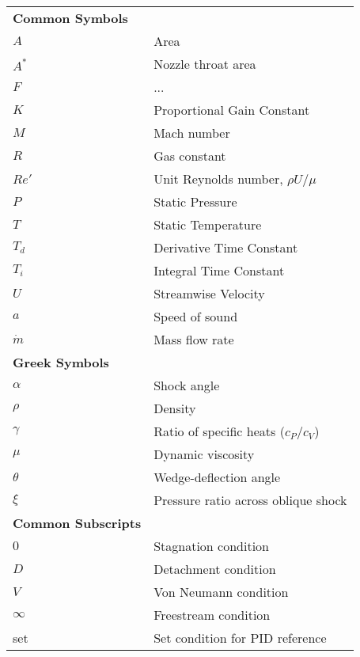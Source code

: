 \begin{spacing}{1.0}
\begin{longtable}[htbp]{@{}p{} p{}@{}}
        \textbf{Common Symbols}\\ [2ex] 
        $A$ & Area \\ [2ex]
        $A^*$ & Nozzle throat area \\ [2ex]
        $F$ & ...\\ [2ex]
        $K$ & Proportional Gain Constant \\ [2ex]
        $M$ & Mach number\\ [2ex]
        $R$ & Gas constant\\ [2ex]
        $Re'$ & Unit Reynolds number, $\rho U/\mu$\\ [2ex]
        $P$ & Static Pressure\\ [2ex]
        $T$ & Static Temperature\\ [2ex]
        $T_d$ & Derivative Time Constant\\ [2ex]
        $T_i$ & Integral Time Constant\\ [2ex]
        $U$ & Streamwise Velocity\\ [2ex]
        $a$ & Speed of sound\\ [2ex]
        $\dot{m}$ & Mass flow rate\\ [2ex]

        \textbf{Greek Symbols}\\ [2ex] 
        $\alpha$ & Shock angle\\ [2ex]
        $\rho$ & Density\\ [2ex]
        $\gamma$ & Ratio of specific heats ($c_P/c_V$) \\ [2ex]
        $\mu$ & Dynamic viscosity\\ [2ex]
        $\theta$ & Wedge-deflection angle \\ [2ex]
        $\xi$ & Pressure ratio across oblique shock\\ [2ex]

        \textbf{Common Subscripts}\\ [2ex] 
        $0$ & Stagnation condition\\ [2ex] 
        $D$ & Detachment condition\\ [2ex]
        $V$ & Von Neumann condition\\ [2ex]
        $\infty$ & Freestream condition\\ [2ex]
        set & Set condition for PID reference\\ [2ex]

	\end{longtable}
\end{spacing}

\pagebreak{}
